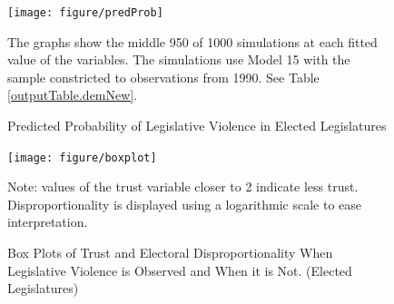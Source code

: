 \documentclass[a4paper]{article}\usepackage{graphicx, color}
\newenvironment{knitrout}{}{} %
\begin{document}
{{\begin{table}[!h]
\begin{center}
\begin{tabular}{c | c c}
    \end{tabular}
    \end{center}
\end{table}





\begin{figure}[t]
    \caption{Predicted Probability of Legislative Violence in Elected Legislatures}  
    \label{pred_prob}
    \begin{center}


\begin{knitrout}
\color{fgcolor}
\texttt{[image: figure/predProb]} 

\end{knitrout}

    \end{center}
    \begin{singlespace}
      {\scriptsize{The graphs show the middle 950 of 1000 simulations at each fitted value of the variables. The simulations use Model 15 with the sample constricted to observations from 1990. See Table \ref{outputTable.demNew}.}}
    \end{singlespace}
\end{figure}

\begin{figure}[t]
    \caption{Box Plots of Trust and Electoral Disproportionality When Legislative Violence is Observed and When it is Not. (Elected Legislatures)}  
    \label{BoxPlot}
    \begin{center}

\begin{knitrout}
\color{fgcolor}
\texttt{[image: figure/boxplot]} 

\end{knitrout}

    \end{center}
    \begin{singlespace}
        {\scriptsize{Note: values of the trust variable closer to 2 indicate less trust. Disproportionality is displayed using a logarithmic scale to ease interpretation. }}
    \end{singlespace}
\end{figure}

}}
\end{document}
